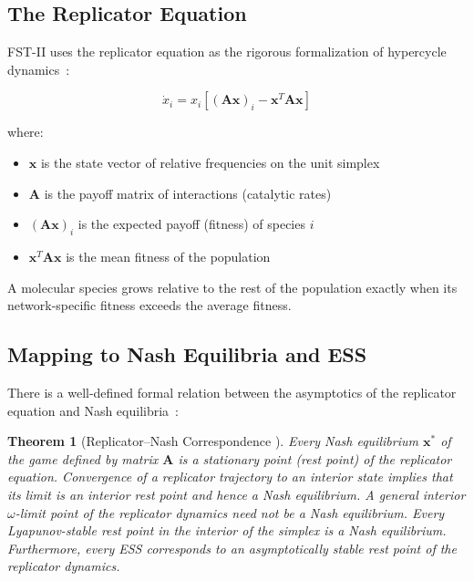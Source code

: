 \documentclass[12pt,a4paper]{article}
\newtheorem{theorem}{Theorem}
\theoremstyle{remark}
\begin{document}
\subsection{The Replicator Equation}

FST-II uses the replicator equation as the rigorous formalization of hypercycle dynamics~\citep{ReplicatorEntropy,ReplicatorDiffusion}:

\begin{equation}
\dot{x}_i = x_i \left[ (\mathbf{A}\mathbf{x})_i - \mathbf{x}^T \mathbf{A} \mathbf{x} \right]
\end{equation}

where:
\begin{itemize}
    \item $\mathbf{x}$ is the state vector of relative frequencies on the unit simplex
    \item $\mathbf{A}$ is the payoff matrix of interactions (catalytic rates)
    \item $(\mathbf{A}\mathbf{x})_i$ is the expected payoff (fitness) of species $i$
    \item $\mathbf{x}^T \mathbf{A} \mathbf{x}$ is the mean fitness of the population
\end{itemize}

A molecular species grows relative to the rest of the population exactly when its network-specific fitness exceeds the average fitness.

\subsection{Mapping to Nash Equilibria and ESS}

There is a well-defined formal relation between the asymptotics of the replicator equation and Nash equilibria~\citep{HofbauerSigmund1998,HofbauerSigmund2003}:

\begin{theorem}[Replicator--Nash Correspondence {\citep{HofbauerSigmund2003,HofbauerSigmund1998}}]
\label{thm:replicator-nash}
Every Nash equilibrium $\mathbf{x}^*$ of the game defined by matrix $\mathbf{A}$ is a stationary point (rest point) of the replicator equation. Convergence of a replicator trajectory to an interior state implies that its limit is an interior rest point and hence a Nash equilibrium. A general interior $\omega$-limit point of the replicator dynamics need not be a Nash equilibrium. Every Lyapunov-stable rest point in the interior of the simplex is a Nash equilibrium. Furthermore, every ESS corresponds to an asymptotically stable rest point of the replicator dynamics.
\end{theorem}
\end{document}
